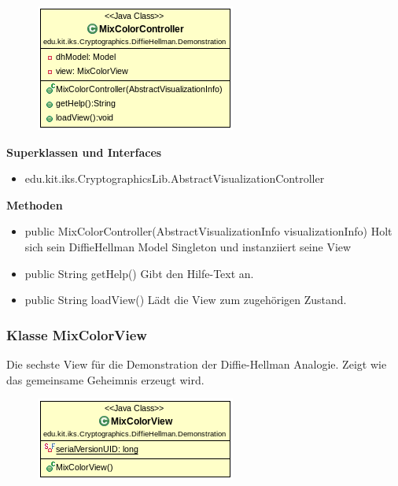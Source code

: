 \documentclass{article}
\begin{document}
      \begin{figure}[H]
        \centering
        \includegraphics{resources/edu-kit-iks-Cryptographics-DiffieHellman-Demonstration-MixColorController}
      \end{figure}

      \textbf{Superklassen und Interfaces}
      \begin{itemize}
        \item edu.kit.iks.CryptographicsLib.AbstractVisualizationController
      \end{itemize}

      \textbf{Methoden}
      \begin{itemize}
          \item public MixColorController(AbstractVisualizationInfo visualizationInfo) \newline
              Holt sich sein DiffieHellman Model Singleton und instanziiert seine View
        \item public String getHelp() \newline
        Gibt den Hilfe-Text an.
        \item public String loadView() \newline
        Lädt die View zum zugehörigen Zustand.
      \end{itemize}

\subsubsection{Klasse MixColorView}
      Die sechste View für die Demonstration der Diffie-Hellman Analogie.
      Zeigt wie das gemeinsame Geheimnis erzeugt wird.

      \begin{figure}[H]
        \centering
        \includegraphics{resources/edu-kit-iks-Cryptographics-DiffieHellman-Demonstration-MixColorView}
      \end{figure}
\end{document}
